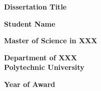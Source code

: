 \thispagestyle{empty}
\begin{center}
\Large

\textbf{Dissertation Title}

\vspace{2.0in}

\textbf{Student Name}

\vspace{1.5in}

\textbf{Master of Science in XXX}

\vspace{0.5in}

\textbf{Department of XXX}\\
\textbf{ Polytechnic University}


\textbf{Year of Award}

\end{center}
